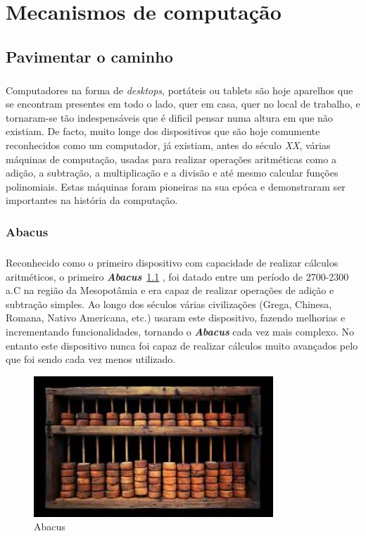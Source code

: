 \documentclass{report}
\begin{document}

\chapter{Mecanismos de computação}
\label{chap.mecanismos}
\section{Pavimentar o caminho}
\paragraph{}
Computadores na forma de \textit{desktops}, portáteis ou tablets são hoje aparelhos que se encontram presentes em todo o lado, quer em casa, quer no local de trabalho, e tornaram-se tão indespensáveis que é dificil pensar numa altura em que não existiam.
De facto, muito longe dos dispositivos que são hoje comumente reconhecidos como um computador, já existiam, antes do século \textit{XX}, várias máquinas de computação, usadas para realizar operações aritméticas como a adição, a subtração, a multiplicação e a divisão e até mesmo calcular funções polinomiais. 
Estas máquinas foram pioneiras na sua epóca e demonstraram ser importantes na história da computação.


\subsection{Abacus}
\paragraph{}
Reconhecido como o primeiro dispositivo com capacidade de realizar cálculos aritméticos, o primeiro \textbf{\textit{Abacus}}~\ref{abacus} \cite{Abacus}, foi datado entre um período de 2700-2300 a.C na região da Mesopotâmia e era capaz de realizar operações de adição e subtração simples. Ao longo dos séculos várias civilizações (Grega, Chinesa, Romana, Nativo Americana, etc.) usaram este dispositivo, fazendo melhorias e incrementando funcionalidades, tornando o \textbf{\textit{Abacus}} cada vez mais complexo. No entanto este dispositivo nunca foi capaz de realizar cálculos muito avançados pelo que foi sendo cada vez menos utilizado.

\begin{figure}[H]
\centering
\includegraphics[width=9cm,scale=1]{Abacus.jpeg}
\caption{Abacus}
\label{abacus}
\end{figure}
\end{document}
